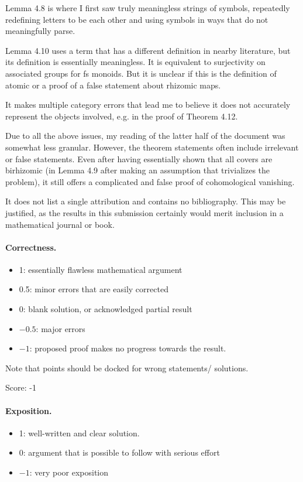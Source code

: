 \documentclass[11pt]{article}
\theoremstyle{definition}
\begin{document}
Lemma 4.8 is where I first saw truly meaningless strings of symbols, repeatedly redefining letters to be each other and using symbols in ways that do not meaningfully parse. 

Lemma 4.10 uses a term that has a different definition in nearby literature, but its definition is essentially meaningless. It is equivalent to surjectivity on associated groups for fs monoids. But it is unclear if this is the definition of atomic or a proof of a false statement about rhizomic maps. 

It makes multiple category errors that lead me to believe it does not accurately represent the objects involved, e.g. in the proof of Theorem 4.12. 

Due to all the above issues, my reading of the latter half of the document was somewhat less granular. However, the theorem statements often include irrelevant or false statements. Even after having essentially shown that all covers are birhizomic (in Lemma 4.9 after making an assumption that trivializes the problem), it still offers a complicated and false proof of cohomological vanishing. 

It does not list a single attribution and contains no bibliography. This may be justified, as the results in this submission certainly would merit inclusion in a mathematical journal or book. 


\paragraph{Correctness.}
\begin{itemize}
	\item  1: essentially flawless mathematical argument
	\item  0.5: minor errors that are easily corrected
	\item  0: blank solution, or acknowledged partial result
	\item  $-0.5$: major errors
	\item  $-1$: proposed proof makes no progress towards the result.
\end{itemize}
Note that points should be docked for wrong statements/ solutions.

\noindent Score: -1

\paragraph{Exposition.}
\begin{itemize}
	\item  1: well-written and clear solution.
	\item  0: argument that is possible to follow with serious effort
	\item  $-1$: very poor exposition
\end{itemize}
\end{document}
